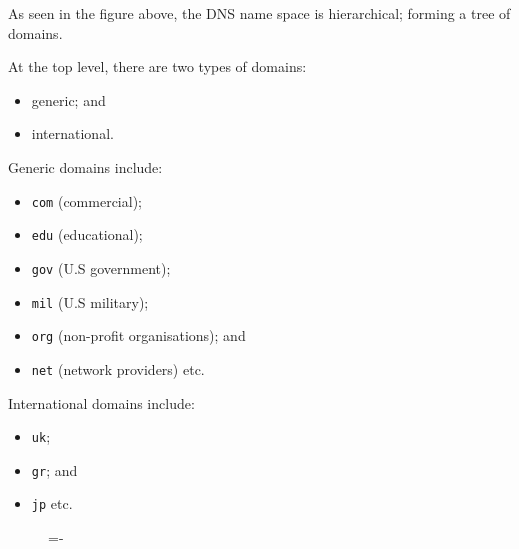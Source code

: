 \documentclass[a4paper]{systems-software}
\begin{document}
As seen in the figure above, the DNS name space is hierarchical; forming a tree of domains.

At the top level, there are two types of domains:
\begin{itemize}
	\item generic; and
	\item international.
\end{itemize}

Generic domains include:
\begin{itemize}
	\item \texttt{com} (commercial);
	\item \texttt{edu} (educational);
	\item \texttt{gov} (U.S government);
	\item \texttt{mil} (U.S military);
	\item \texttt{org} (non-profit organisations); and
	\item \texttt{net} (network providers) etc.
\end{itemize}

International domains include:
\begin{itemize}
	\item \texttt{uk};
	\item \texttt{gr}; and
	\item \texttt{jp} etc.
\end{itemize}

\begin{figure}[H]
	\lineskip=-\fboxrule
\end{figure}
\end{document}
